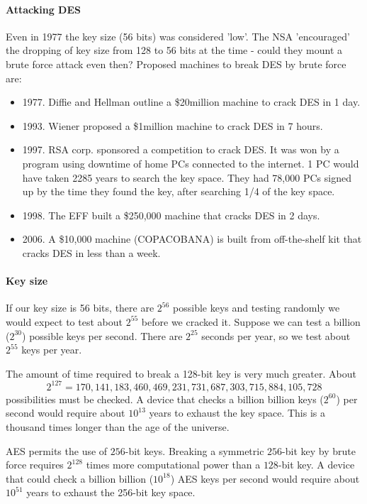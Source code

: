 \documentclass[a4paper, 11pt, openany]{book}
\numberwithin{equation}{section}
\theoremstyle{plain}
\theoremstyle{definition}
\begin{document}
\paragraph{Attacking DES}
Even in 1977 the key size (56 bits) was considered 'low'.
The NSA 'encouraged' the dropping of key size from 128 to 56 bits at the time - could they mount a brute force attack even then?
Proposed machines to break DES by brute force are:
\begin{itemize}
    \item 1977. Diffie and Hellman outline a \$20million machine to crack DES in 1 day.
    
    \item 1993. Wiener proposed a \$1million machine to crack DES in 7 hours.
    
    \item 1997. RSA corp. sponsored a competition to crack DES. It was won by a program using downtime of home PCs connected to the internet. 1 PC would have taken 2285 years to search the key space. They had 78,000 PCs signed up by the time they found the key, after searching 1/4 of the key space.
    
    \item 1998. The EFF built a \$250,000 machine that cracks DES in 2 days.
    
    \item 2006. A \$10,000 machine (COPACOBANA) is built from off-the-shelf kit that cracks DES in less than a week.
\end{itemize}



\paragraph{Key size}
If our key size is 56 bits, there are $2^{56}$ possible keys and testing randomly we would expect to test about $2^{55}$ before we cracked it. Suppose we can test a billion ($2^{30}$) possible keys per second. There are $2^{25}$ seconds per year, so we test about $2^{55}$ keys per year. 

The amount of time required to break a 128-bit key is very much greater. About 
\[
    2^{127} = 170,141,183,460,469,231,731,687,303,715,884,105,728
\]
possibilities must be checked. A device that checks a billion billion keys ($2^{60}$) per second would require about $10^{13}$ years to exhaust the key space. This is a thousand times longer than the age of the universe.

AES permits the use of $256$-bit keys. Breaking a symmetric $256$-bit key by brute force requires $2^{128}$ times more computational power than a $128$-bit key. A device that could check a billion billion ($10^{18}$) AES keys per second would require about $10^{51}$ years to exhaust the 256-bit key space.
\end{document}
